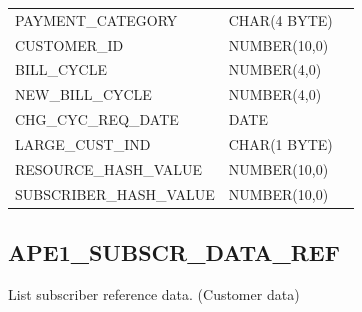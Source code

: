 \documentclass[12pt,twoside]{article}
\begin{document}
\begin{center}
\begin{tabular}{lll}
 PAYMENT\_CATEGORY        &  CHAR(4 BYTE)        &                        \\
 CUSTOMER\_ID             &  NUMBER(10,0)        &                        \\
 BILL\_CYCLE              &  NUMBER(4,0)         &                        \\
 NEW\_BILL\_CYCLE         &  NUMBER(4,0)         &                        \\
 CHG\_CYC\_REQ\_DATE      &  DATE                &                        \\
 LARGE\_CUST\_IND         &  CHAR(1 BYTE)        &                        \\
 RESOURCE\_HASH\_VALUE    &  NUMBER(10,0)        &                        \\
 SUBSCRIBER\_HASH\_VALUE  &  NUMBER(10,0)        &                        \\
\hline
\end{tabular}
\end{center}


\normalsize
 
\newpage
\subsection{APE1\_SUBSCR\_DATA\_REF}
\label{sec-9-4}

   List subscriber reference data. (Customer data)
\scriptsize
\end{document}
